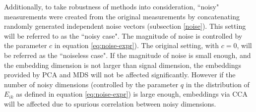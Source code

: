\documentclass[11pt]{article} %
\begin{document}
 Additionally, to take robustness of methods into consideration, ``noisy" measurements were created from the original measurements by concatenating randomly generated independent noise vectors (subsection \ref{noise}).   This setting will be referred to as the ``noisy case". The magnitude of noise is controlled by the parameter $c$ in equation \eqref{eq:noise-expr}). The original setting, with $c=0$,  will be referred as the ``noiseless case".
If the magnitude of noise is small enough, and the embedding dimension is not larger than signal dimension, the embeddings provided by PCA and MDS will not be affected significantly. However  if the number of noisy dimensions (controlled by the parameter $q$ in the distribution of $E_{ik}$ as defined in equation \eqref{eq:noise-expr}) is large enough, embeddings via  CCA  will be affected due to spurious correlation between noisy dimensions.
\end{document}
